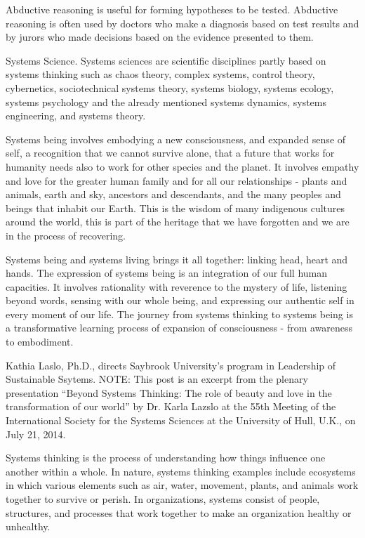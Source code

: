 Abductive reasoning is useful for forming hypotheses to be tested. Abductive reasoning is often used by doctors who make a diagnosis based on test results and by jurors who made decisions based on the evidence presented to them.

Systems Science. Systems sciences are scientific disciplines partly based on systems thinking such as chaos theory, complex systems, control theory, cybernetics, sociotechnical systems theory, systems biology, systems ecology, systems psychology and the already mentioned systems dynamics, systems engineering, and systems theory.

Systems being involves embodying a new consciousness, and expanded sense of self, a recognition that we cannot survive alone, that a future that works for humanity needs also to work for other species and the planet. It involves empathy and love for the greater human family and for all our relationships - plants and animals, earth and sky, ancestors and descendants, and the many peoples and beings that inhabit our Earth. This is the wisdom of many indigenous cultures around the world, this is part of the heritage that we have forgotten and we are in the process of recovering.

Systems being and systems living brings it all together: linking head, heart and hands. The expression of systems being is an integration of our full human capacities. It involves rationality with reverence to the mystery of life, listening beyond words, sensing with our whole being, and expressing our authentic self in every moment of our life. The journey from systems thinking to systems being is a transformative learning process of expansion of consciousness - from awareness to embodiment.

Kathia Laslo, Ph.D., directs Saybrook University’s program in Leadership of Sustainable Ssytems.
NOTE: This post is an excerpt from the plenary presentation “Beyond Systems Thinking: The role of beauty and love in the transformation of our world” by Dr. Karla Lazslo at the 55th Meeting of the International Society for the Systems Sciences at the University of Hull, U.K., on July 21, 2014.

Systems thinking is the process of understanding how things influence one another within a whole. In nature, systems thinking examples include ecosystems in which various elements such as air, water, movement, plants, and animals work together to survive or perish. In organizations, systems consist of people, structures, and processes that work together to make an organization healthy or unhealthy.

